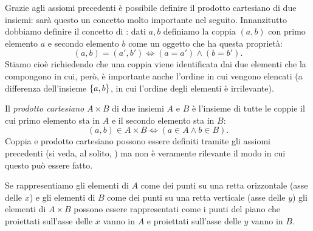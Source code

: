 Grazie agli assiomi precedenti è possibile definire il prodotto cartesiano
di due insiemi: sarà questo un concetto molto importante nel seguito.
Innanzitutto dobbiamo definire il concetto di : dati
$a,b$ definiamo la coppia $(a,b)$ con primo elemento $a$ e secondo elemento $b$
come un oggetto che ha questa proprietà:
\[
  (a, b) = (a', b') \iff (a=a') \land (b=b').
\]
Stiamo cioè richiedendo che una coppia viene identificata dai due
elementi che la compongono in cui, però, è importante anche l'ordine in
cui vengono elencati (a differenza dell'insieme ${\left\{ a,b \right\}}$, in cui
l'ordine degli elementi è irrilevante).

Il \emph{prodotto cartesiano} $A\times B$ di due insiemi $A$ e $B$
è l'insieme di tutte le coppie il cui primo elemento sta in $A$ e
il secondo elemento sta in $B$:
\[
  (a, b) \in A \times B \iff (a\in A \land b\in B).
\]
Coppia e prodotto cartesiano possono essere definiti tramite gli
assiomi precedenti (si veda, al solito, \cite{appunti_logica})
ma non è veramente rilevante il modo in cui questo può essere fatto.

Se rappresentiamo gli elementi di $A$ come dei punti su una retta
orizzontale (asse delle $x$) e gli elementi di $B$ come dei punti
su una retta verticale (asse delle $y$) gli elementi di $A\times B$
possono essere rappresentati come i punti del piano che proiettati sull'asse
delle $x$ vanno in $A$ e proiettati sull'asse delle $y$ vanno in $B$.

